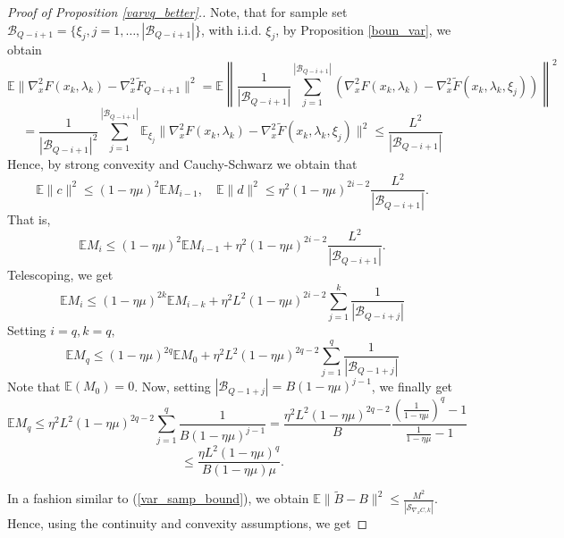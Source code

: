 \documentclass[11pt, twoside]{report}
\begin{document}
\begin{proof}[Proof of Proposition \ref{varvq_better}.]
    Note, that for sample set $\mathcal{B}_{Q-i+1} = \{\xi_j, j=1,\hdots,|\mathcal{B}_{Q-i+1} |\}$, with i.i.d. $\xi_j$, by Proposition \ref{boun_var}, we obtain
    \[\mathbb{E}\|\nabla_x^2 F(x_k,\lambda_k) - \nabla_x^2 \tilde{F}_{Q-i+1}\|^2 = \mathbb{E} \left\|\frac{1}{|\mathcal{B}_{Q-i+1}|} \sum_{j=1}^{|\mathcal{B}_{Q-i+1}|} \left(\nabla_x^2 F(x_k,\lambda_k) - \nabla_x^2 \tilde{F}(x_k,\lambda_k,\xi_j) \right) \right\|^2\]
    \begin{equation} \label{var_samp_bound}
        =\frac{1}{|\mathcal{B}_{Q-i+1}|^2}\sum_{j=1}^{|\mathcal{B}_{Q-i+1}|}\mathbb{E}_{\xi_j} \|\nabla_x^2 F(x_k,\lambda_k) - \nabla_x^2 \tilde{F}(x_k,\lambda_k,\xi_j)\|^2 \leq \frac{L^2}{|\mathcal{B}_{Q-i+1}|}
    \end{equation}
    Hence, by strong convexity and Cauchy-Schwarz we obtain that
    \[\mathbb{E}\|c\|^2 \leq (1-\eta \mu)^2 \mathbb{E} M_{i-1}, \quad \mathbb{E}\|d\|^2 \leq  \eta^2 (1-\eta \mu)^{2i-2} \frac{L^2}{|\mathcal{B}_{Q-i+1}|}.\]
    That is, 
    \[\mathbb{E}M_i \leq (1-\eta \mu)^2 \mathbb{E} M_{i-1} + \eta^2 (1-\eta \mu)^{2i-2} \frac{L^2}{|\mathcal{B}_{Q-i+1}|}.\]
    Telescoping, we get
    \[\mathbb{E}M_i \leq (1-\eta \mu)^{2k} \mathbb{E}M_{i-k} + \eta^2L^2(1-\eta\mu)^{2i-2} \sum_{j=1}^{k} \frac{1}{|\mathcal{B}_{Q-i+j}|} \]
    Setting $i=q, k = q,$
    \[\mathbb{E}M_q \leq (1-\eta \mu)^{2q} \mathbb{E}M_{0} + \eta^2L^2 (1-\eta\mu)^{2q-2} \sum_{j=1}^{q} \frac{1}{|\mathcal{B}_{Q-1+j}|}\]
    Note that $\mathbb{E}(M_0) = 0$.
    Now, setting $|\mathcal{B}_{Q-1+j}| = B(1-\eta\mu)^{j-1}$, we finally get
    \[
        \mathbb{E}M_q \leq \eta^2L^2 (1-\eta\mu)^{2q-2} \sum_{j=1}^{q} \frac{1}{B(1-\eta\mu)^{j-1}} = \frac{\eta^2L^2 (1-\eta\mu)^{2q-2}}{B}  \frac{\left(\frac{1}{1-\eta \mu}\right)^{q}-1}{\frac{1}{1-\eta \mu}-1}
    \]
    \begin{equation} \label{EM_bound2}
        \leq \frac{\eta L^2 (1-\eta\mu)^{q}}{B(1-\eta\mu)\mu}.
    \end{equation}

In a fashion similar to (\ref{var_samp_bound}), we obtain $\mathbb{E} \|\tilde{B} - B\|^2 \leq \frac{M^2}{|\mathcal{S}_{\nabla_x C,k}|}$. Hence, using the continuity and convexity assumptions, we get


\end{proof}
\end{document}
